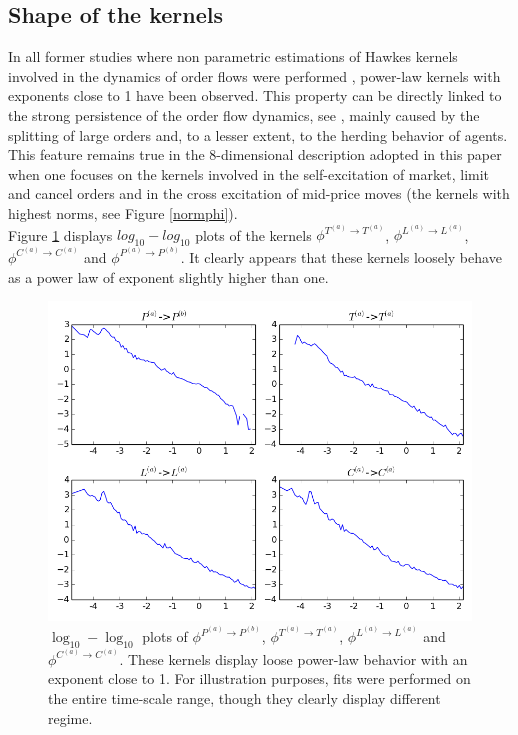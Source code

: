 \documentclass[a4paper,11pt]{article}
\newcommand{\PA}{P^{(a)}}
\newcommand{\PB}{P^{(b)}}
\newcommand{\TA}{T^{(a)}}
\newcommand{\CA}{C^{(a)}}
\newcommand{\LA}{L^{(a)}}
\begin{document}

\subsection{Shape of the kernels}
\label{shape}
In all former studies where non parametric estimations of Hawkes kernels involved in
the dynamics of order flows
were performed \cite{bacry2012non,bacry2014hawkes,hardiman2013critical}, power-law kernels with exponents close to 1 have been observed.
This property can be directly linked to the strong persistence of the order flow dynamics, see \cite{jaisson2014market}, mainly caused by the splitting of large orders and, to a lesser extent,  to the herding behavior of agents. This feature remains true in the 8-dimensional description adopted in this paper when one focuses on the kernels involved in the self-excitation of market, limit and cancel orders and in the cross excitation of mid-price moves (the kernels with highest norms, see Figure \ref{normphi}).\\

\noindent Figure \ref{loglogpowerlaw} displays $log_{10}-log_{10}$ plots of the kernels $\phi^{\TA\rightarrow \TA}$, $\phi^{\LA\rightarrow \LA}$, $\phi^{\CA\rightarrow \CA}$ and $\phi^{\PA\rightarrow \PB}$. It clearly appears that these kernels loosely behave as a power law of exponent slightly higher than one.
\begin{figure}[H]
\centering
\includegraphics[width=\textwidth]{powerlaw.png}
\vspace{-32pt}
\caption{$\log_{10}-\log_{10}$ plots of $\phi^{\PA\rightarrow \PB}$, $\phi^{\TA\rightarrow \TA}$, $\phi^{\LA\rightarrow \LA}$ and $\phi^{\CA\rightarrow \CA}$. These kernels display loose power-law behavior with an exponent close to 1. For illustration purposes, fits were performed on the entire time-scale range, though they clearly display different regime.}
\label{loglogpowerlaw}
\end{figure}
\end{document}
